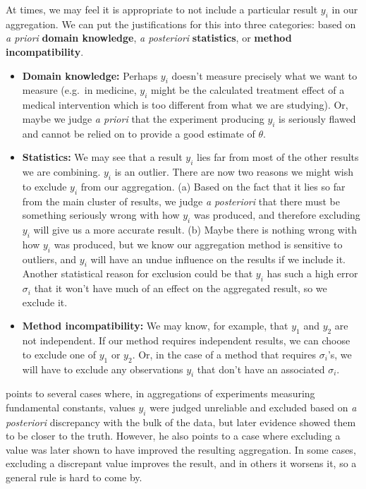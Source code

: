 \documentclass[letterpaper,12pt]{article}
\begin{document}
At times, we may feel it is appropriate to not include a particular result $y_i$ in our aggregation. We can put the justifications for this into three categories: based on \textit{a priori} \textbf{domain knowledge}, \textit{a posteriori} \textbf{statistics}, or \textbf{method incompatibility}.

\begin{itemize}
  \item \textbf{Domain knowledge:} Perhaps $y_i$ doesn't measure precisely what we want to measure (e.g.~in medicine, $y_i$ might be the calculated treatment effect of a medical intervention which is too different from what we are studying). Or, maybe we judge \textit{a priori} that the experiment producing $y_i$ is seriously flawed and cannot be relied on to provide a good estimate of $\theta$.
  \item \textbf{Statistics:} We may see that a result $y_i$ lies far from most of the other results we are combining. $y_i$ is an outlier. There are now two reasons we might wish to exclude $y_i$ from our aggregation. (a) Based on the fact that it lies so far from the main cluster of results, we judge \textit{a posteriori} that there must be something seriously wrong with how $y_i$ was produced, and therefore excluding $y_i$ will give us a more accurate result. (b) Maybe there is nothing wrong with how $y_i$ was produced, but we know our aggregation method is sensitive to outliers, and $y_i$ will have an undue influence on the results if we include it. Another statistical reason for exclusion could be that $y_i$ has such a high error $\sigma_i$ that it won't have much of an effect on the aggregated result, so we exclude it.
  \item \textbf{Method incompatibility:} We may know, for example, that $y_1$ and $y_2$ are not independent. If our method requires independent results, we can choose to exclude one of $y_1$ or $y_2$. Or, in the case of a method that requires $\sigma_i$'s, we will have to exclude any observations $y_i$ that don't have an associated $\sigma_i$.
\end{itemize}

\citet{taylor1982numerical} points to several cases where, in aggregations of experiments measuring fundamental constants, values $y_i$ were judged unreliable and excluded based on \textit{a posteriori} discrepancy with the bulk of the data, but later evidence showed them to be closer to the truth. However, he also points to a case where excluding a value was later shown to have improved the resulting aggregation. In some cases, excluding a discrepant value improves the result, and in others it worsens it, so a general rule is hard to come by.
\end{document}
